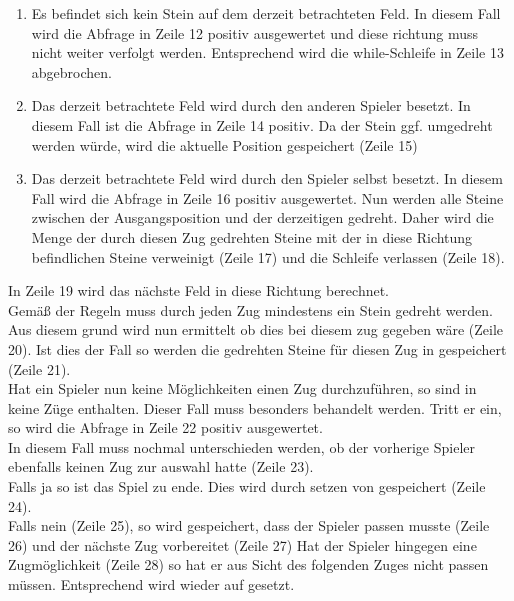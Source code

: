 \begin{enumerate}
\setcounter{enumi}{0}
\item Es befindet sich kein Stein auf dem derzeit betrachteten Feld. In diesem Fall wird die Abfrage in Zeile 12 positiv ausgewertet und diese richtung muss nicht weiter verfolgt werden. Entsprechend wird die while-Schleife in Zeile 13 abgebrochen.
\item Das derzeit betrachtete Feld wird durch den anderen Spieler besetzt. In diesem Fall ist die Abfrage in Zeile 14 positiv. Da der Stein ggf. umgedreht werden würde, wird die aktuelle Position gespeichert (Zeile 15)
\item Das derzeit betrachtete Feld wird durch den Spieler selbst besetzt. In diesem Fall wird die Abfrage in Zeile 16 positiv ausgewertet. Nun werden alle Steine zwischen der Ausgangsposition und der derzeitigen gedreht. Daher wird die Menge der durch diesen Zug gedrehten Steine mit der in diese Richtung befindlichen Steine verweinigt (Zeile 17) und die Schleife verlassen (Zeile 18).
\end{enumerate}
In Zeile 19 wird das nächste Feld in diese Richtung berechnet.
\\Gemäß der Regeln muss durch jeden Zug mindestens ein Stein gedreht werden. Aus diesem grund wird nun ermittelt ob dies bei diesem zug gegeben wäre (Zeile 20). Ist dies der Fall so werden die gedrehten Steine für diesen Zug in  gespeichert (Zeile 21).
\\Hat ein Spieler nun keine Möglichkeiten einen Zug durchzuführen, so sind in  keine Züge enthalten. Dieser Fall muss besonders behandelt werden. Tritt er ein, so wird die Abfrage in Zeile 22 positiv ausgewertet.
\\In diesem Fall muss nochmal unterschieden werden, ob der vorherige Spieler ebenfalls keinen Zug zur auswahl hatte (Zeile 23).
\\Falls ja so ist das Spiel zu ende. Dies wird durch setzen von  gespeichert (Zeile 24).
\\Falls nein (Zeile 25), so wird gespeichert, dass der Spieler passen musste (Zeile 26) und der nächste Zug vorbereitet (Zeile 27)
Hat der Spieler hingegen eine Zugmöglichkeit (Zeile 28) so hat er aus Sicht des folgenden Zuges nicht passen müssen. Entsprechend wird  wieder auf  gesetzt. 
